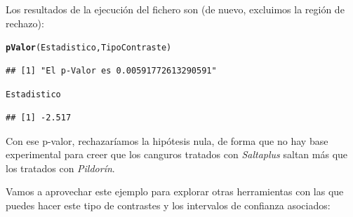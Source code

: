 \documentclass[10pt,a4paper]{article}\usepackage[]{graphicx}\usepackage[]{color}
\makeatletter
\newcommand{\hlstd}[1]{\textcolor[rgb]{0.345,0.345,0.345}{#1}}%
\newcommand{\hlkwd}[1]{\textcolor[rgb]{0.737,0.353,0.396}{\textbf{#1}}}%
\newenvironment{kframe}{%
 \def\at@end@of@kframe{}%
 \ifinner\ifhmode%
  \def\at@end@of@kframe{\end{minipage}}%
  \begin{minipage}{\columnwidth}%
 \fi\fi%
 \def\FrameCommand##1{\hskip\@totalleftmargin \hskip-\fboxsep
 \colorbox{shadecolor}{##1}\hskip-\fboxsep
     \hskip-\linewidth \hskip-\@totalleftmargin \hskip\columnwidth}%
 \MakeFramed {\advance\hsize-\width
   \@totalleftmargin\z@ \linewidth\hsize
   \@setminipage}}%
 {\par\unskip\endMakeFramed%
 \at@end@of@kframe}
\newenvironment{knitrout}{}{} %
\newcounter {cont01}
\makeatother
\begin{document}
Los resultados de la ejecución del fichero son (de nuevo, excluimos la región de rechazo):
\begin{knitrout}
\color{fgcolor}\begin{kframe}
\begin{alltt}
    \hlkwd{pValor}\hlstd{(Estadistico, TipoContraste)}
\end{alltt}
\begin{verbatim}
## [1] "El p-Valor es 0.00591772613290591"
\end{verbatim}
\begin{alltt}
    \hlstd{Estadistico}
\end{alltt}
\begin{verbatim}
## [1] -2.517
\end{verbatim}
\end{kframe}
\end{knitrout}
Con ese p-valor, rechazaríamos la hipótesis nula, de forma que no hay base experimental para creer que los canguros tratados con {\em Saltaplus} saltan más que los tratados con {\em Pildorín}.


Vamos a aprovechar este ejemplo para explorar otras herramientas con las que puedes hacer este tipo de contrastes y los intervalos de confianza asociados:
\end{document}
